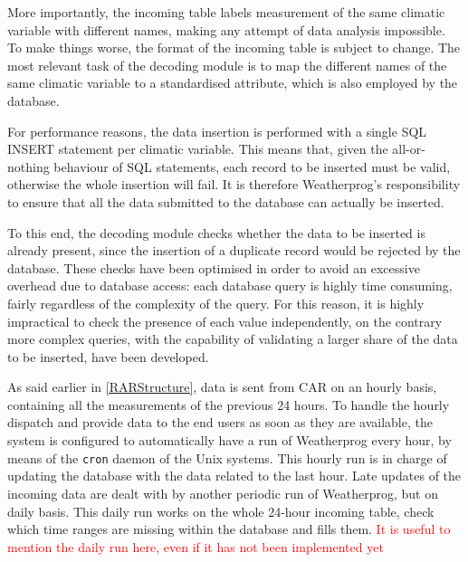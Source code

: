 \documentclass[authoryear,preprint,review,12pt]{elsarticle}
\begin{document}
 More importantly, the incoming table labels measurement of the same climatic variable with different names, making any attempt of data analysis impossible. To make things worse, the format of the incoming table is subject to change. The most relevant task of the decoding module is to map the different names of the same climatic variable to a standardised attribute, which is also employed by the database.
 
 For performance reasons, the data insertion is performed with a single SQL INSERT statement per climatic variable. This means that, given the all-or-nothing behaviour of SQL statements, each record to be inserted must be valid, otherwise the whole insertion will fail. It is therefore Weatherprog's responsibility to ensure that all the data submitted to the database can actually be inserted.
 
 To this end, the decoding module checks whether the data to be inserted is already present, since the insertion of a duplicate record would be rejected by the database. These checks have been optimised in order to avoid an excessive overhead due to database access: each database query is highly time consuming, fairly regardless of the complexity of the query. For this reason, it is highly impractical to check the presence of each value independently, on the contrary more complex queries, with the capability of validating a larger share of the data to be inserted, have been developed.
 
As said earlier in \cref{RARStructure}, data is sent from CAR on an hourly basis,  containing all the measurements of the previous 24 hours. To handle the hourly dispatch and provide data to the end users as soon as they are available, the system is configured to automatically have a run of Weatherprog every hour, by means of the \texttt{cron} daemon of the Unix systems. This hourly run is in charge of updating the database with the data related to the last hour. Late updates of the incoming data are dealt with by another periodic run of Weatherprog, but on daily basis. This daily run works on the whole 24-hour incoming table, check which time ranges are missing within the database and fills them. \textcolor{Red}{It is useful to mention the daily run here, even if it has not been implemented yet}
\end{document}
